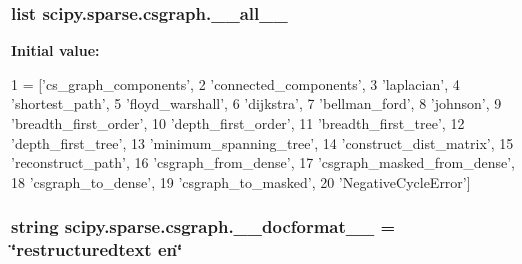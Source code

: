 \subsubsection[{\+\_\+\+\_\+all\+\_\+\+\_\+}]{\setlength{\rightskip}{0pt plus 5cm}list scipy.\+sparse.\+csgraph.\+\_\+\+\_\+all\+\_\+\+\_\+}\label{namespacescipy_1_1sparse_1_1csgraph_a0d2763aed53deb59f8e760fcdd1b2c65}
{\bfseries Initial value\+:}
\begin{DoxyCode}
1 = [\textcolor{stringliteral}{'cs\_graph\_components'},
2            \textcolor{stringliteral}{'connected\_components'},
3            \textcolor{stringliteral}{'laplacian'},
4            \textcolor{stringliteral}{'shortest\_path'},
5            \textcolor{stringliteral}{'floyd\_warshall'},
6            \textcolor{stringliteral}{'dijkstra'},
7            \textcolor{stringliteral}{'bellman\_ford'},
8            \textcolor{stringliteral}{'johnson'},
9            \textcolor{stringliteral}{'breadth\_first\_order'},
10            \textcolor{stringliteral}{'depth\_first\_order'},
11            \textcolor{stringliteral}{'breadth\_first\_tree'},
12            \textcolor{stringliteral}{'depth\_first\_tree'},
13            \textcolor{stringliteral}{'minimum\_spanning\_tree'},
14            \textcolor{stringliteral}{'construct\_dist\_matrix'},
15            \textcolor{stringliteral}{'reconstruct\_path'},
16            \textcolor{stringliteral}{'csgraph\_from\_dense'},
17            \textcolor{stringliteral}{'csgraph\_masked\_from\_dense'},
18            \textcolor{stringliteral}{'csgraph\_to\_dense'},
19            \textcolor{stringliteral}{'csgraph\_to\_masked'},
20            \textcolor{stringliteral}{'NegativeCycleError'}]
\end{DoxyCode}
\hypertarget{namespacescipy_1_1sparse_1_1csgraph_ad809c379a5b7654e8e0a794daad65293}{}
\subsubsection[{\+\_\+\+\_\+docformat\+\_\+\+\_\+}]{\setlength{\rightskip}{0pt plus 5cm}string scipy.\+sparse.\+csgraph.\+\_\+\+\_\+docformat\+\_\+\+\_\+ = \char`\"{}restructuredtext en\char`\"{}}\label{namespacescipy_1_1sparse_1_1csgraph_ad809c379a5b7654e8e0a794daad65293}
\hypertarget{namespacescipy_1_1sparse_1_1csgraph_a5180c25e1d6d99f0df41c6127fac17d9}{}
